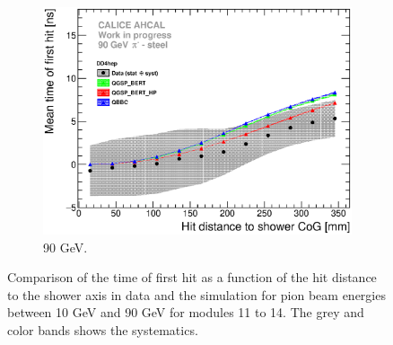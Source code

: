 \begin{figure}[htbp!]
\begin{subfigure}[t]{0.49\textwidth}
    \includegraphics[width=1\textwidth]{../Thesis_Plots/Timing/Pions/Plots/ComparisonToSim/Time_Radius_90GeV_BL_DD4hep.eps}
    \caption{90 GeV.} \label{fig:Radius_BL_SimData_90GeV_DD4hep}
  \end{subfigure}
  \caption{Comparison of the time of first hit as a function of the hit distance to the shower axis in data and the \ddhep simulation for pion beam energies between 10 GeV and 90 GeV for modules 11 to 14. The grey and color bands shows the systematics.}
  \label{fig:Radius_BL_SimData_Comparison_DD4hep}
\end{figure}


